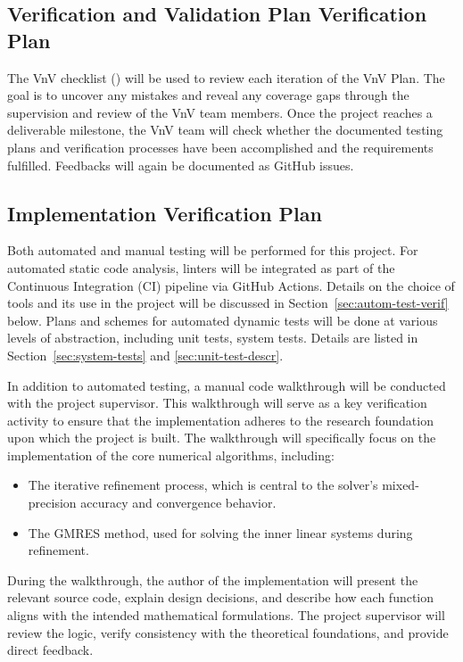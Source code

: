 \documentclass[12pt, titlepage]{article}
\begin{document}
\subsection{Verification and Validation Plan Verification Plan}

The VnV checklist (\cite{VnV_checklist}) will be used to review each iteration of
the VnV Plan. The goal is to uncover any mistakes and reveal any coverage gaps
through the supervision and review of the VnV team members. Once the project
reaches a deliverable milestone, the VnV team will check whether the documented
testing plans and verification processes have been accomplished and the
requirements fulfilled. Feedbacks will again be documented as GitHub issues.

\subsection{Implementation Verification Plan}

Both automated and manual testing will be performed for this project. For
automated static code analysis, linters will be integrated as part of the
Continuous Integration (CI) pipeline via GitHub Actions. Details on the choice
of tools and its use in the project will be discussed in
Section~\ref{sec:autom-test-verif} below. Plans and schemes for automated
dynamic tests will be done at various levels of abstraction, including unit
tests, system tests. Details are listed in Section~\ref{sec:system-tests} and
\ref{sec:unit-test-descr}.

In addition to automated testing, a manual code walkthrough will be conducted
with the project supervisor. This walkthrough will serve as a key verification
activity to ensure that the implementation adheres to the research foundation
upon which the project is built. The walkthrough will specifically focus on the
implementation of the core numerical algorithms, including:

\begin{itemize}
\item The iterative refinement process, which is central to the solver's
  mixed-precision accuracy and convergence behavior.
\item The GMRES method, used for solving the inner linear systems during
  refinement.
\end{itemize}

During the walkthrough, the author of the implementation will present the
relevant source code, explain design decisions, and describe how each function
aligns with the intended mathematical formulations. The project supervisor will
review the logic, verify consistency with the theoretical foundations, and
provide direct feedback.
\end{document}

